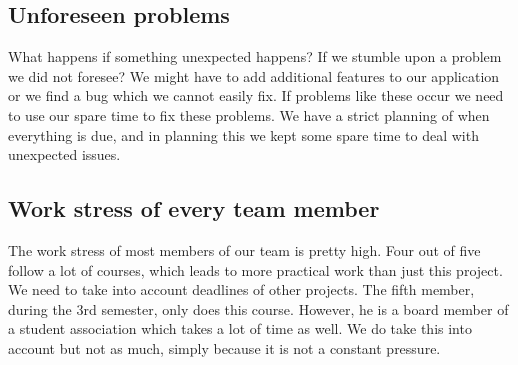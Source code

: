 \documentclass[a4paper]{article}
\begin{document}
\subsection{Unforeseen problems}
What happens if something unexpected happens? If we stumble upon a problem we did not foresee? We might have to add additional features to our application or we find a bug which we cannot easily fix. If problems like these occur we need to use our spare time to fix these problems. We have a strict planning of when everything is due, and in planning this we kept some spare time to deal with unexpected issues.

\subsection{Work stress of every team member}
The work stress of most members of our team is pretty high. Four out of five follow a lot of courses, which leads to more practical work than just this project. We need to take into account deadlines of other projects. The fifth member, during the 3rd semester, only does this course. However, he is a board member of a student association which takes a lot of time as well. We do take this into account but not as much, simply because it is not a constant pressure.
\end{document}
